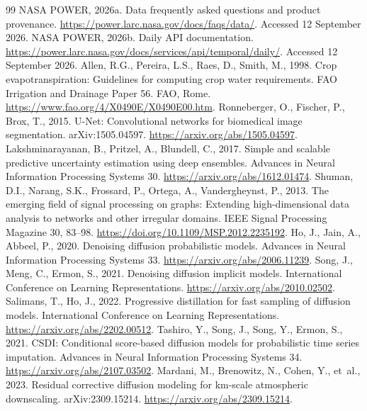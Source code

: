 \documentclass[preprint,12pt,authoryear]{elsarticle}
\begin{document}
\begingroup\small
\begin{thebibliography}{99}
 NASA POWER, 2026a. Data frequently asked questions and product provenance. \url{https://power.larc.nasa.gov/docs/faqs/data/}. Accessed 12 September 2026.
 NASA POWER, 2026b. Daily API documentation. \url{https://power.larc.nasa.gov/docs/services/api/temporal/daily/}. Accessed 12 September 2026.
 Allen, R.G., Pereira, L.S., Raes, D., Smith, M., 1998. Crop evapotranspiration: Guidelines for computing crop water requirements. FAO Irrigation and Drainage Paper 56. FAO, Rome. \url{https://www.fao.org/4/X0490E/X0490E00.htm}.
 Ronneberger, O., Fischer, P., Brox, T., 2015. U-Net: Convolutional networks for biomedical image segmentation. arXiv:1505.04597. \url{https://arxiv.org/abs/1505.04597}.
 Lakshminarayanan, B., Pritzel, A., Blundell, C., 2017. Simple and scalable predictive uncertainty estimation using deep ensembles. Advances in Neural Information Processing Systems 30. \url{https://arxiv.org/abs/1612.01474}.
 Shuman, D.I., Narang, S.K., Frossard, P., Ortega, A., Vandergheynst, P., 2013. The emerging field of signal processing on graphs: Extending high-dimensional data analysis to networks and other irregular domains. IEEE Signal Processing Magazine 30, 83--98. \url{https://doi.org/10.1109/MSP.2012.2235192}.
 Ho, J., Jain, A., Abbeel, P., 2020. Denoising diffusion probabilistic models. Advances in Neural Information Processing Systems 33. \url{https://arxiv.org/abs/2006.11239}.
 Song, J., Meng, C., Ermon, S., 2021. Denoising diffusion implicit models. International Conference on Learning Representations. \url{https://arxiv.org/abs/2010.02502}.
 Salimans, T., Ho, J., 2022. Progressive distillation for fast sampling of diffusion models. International Conference on Learning Representations. \url{https://arxiv.org/abs/2202.00512}.
 Tashiro, Y., Song, J., Song, Y., Ermon, S., 2021. CSDI: Conditional score-based diffusion models for probabilistic time series imputation. Advances in Neural Information Processing Systems 34. \url{https://arxiv.org/abs/2107.03502}.
 Mardani, M., Brenowitz, N., Cohen, Y., et~al., 2023. Residual corrective diffusion modeling for km-scale atmospheric downscaling. arXiv:2309.15214. \url{https://arxiv.org/abs/2309.15214}.

\end{thebibliography}
\end{document}
